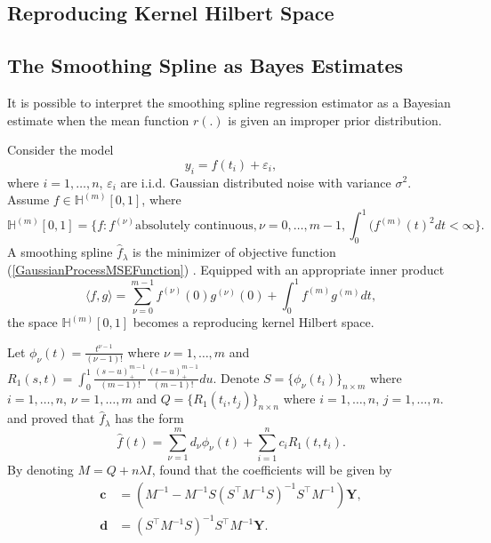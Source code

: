 \subsection{Reproducing Kernel Hilbert Space}



\subsection{The Smoothing Spline as Bayes Estimates}
It is possible to interpret the smoothing spline regression estimator as a Bayesian estimate when the mean function $r( .)$ is given an improper prior distribution. \cite{berlinet2011reproducing}
\cite{wahba1990spline}


Consider the model
\begin{equation}
y_i=f(t_i)+\varepsilon_i, 
\end{equation}
where $i=1, \ldots, n$, $\varepsilon_i$ are i.i.d. Gaussian distributed noise with variance $\sigma^2$. Assume $f\in \mathbb{H}^{(m)}[0,1]$, where
\begin{equation}
\mathbb{H}^{(m)}[0,1]=\{f:f^{(\nu)} \mbox{absolutely continuous}, \nu=0,\ldots,m-1, \int_{0}^{1} (f^{(m)}(t)^2dt<\infty \}.
\end{equation}
A smoothing spline $\hat{f}_\lambda$ is the minimizer of objective function (\ref{GaussianProcessMSEFunction}) \cite{wang1998smoothing}. Equipped with an appropriate inner product
\begin{equation}
\langle f,g\rangle=\sum_{\nu=0}^{m-1}f^{(\nu)}(0)g^{(\nu)}(0)+\int_{0}^{1}f^{(m)}g^{(m)}dt,
\end{equation}
the space $\mathbb{H}^{(m)}[0,1]$ becomes a reproducing kernel Hilbert space.

Let $\phi_\nu (t)=\frac{t^{\nu-1}}{(\nu-1)!}$ where $\nu=1, \ldots, m$ and $R_1(s,t)=\int_0^1\frac{ (s-u)_+^{m-1}}{(m-1)!} \frac{ (t-u)_+^{m-1}}{(m-1)!} du$. Denote $S=\{\phi_\nu (t_i) \}_{n\times m}$ where $i=1, \ldots, n$, $\nu=1, \ldots, m$ and $Q=\{ R_1(t_i,t_j)\}_{n\times n}$ where $i=1, \ldots, n$, $j=1, \ldots, n$. \cite{kimeldorf1971some} and \cite{kimeldorf1970correspondence}  proved that $\hat{f}_\lambda$ has the form
\begin{equation}
\hat{f}(t)=\sum_{\nu=1}^m d_\nu \phi_\nu(t)+\sum_{i=1}^n c_iR_1(t,t_i).
\end{equation}
By denoting $M=Q+n\lambda I$, \cite{gu2013smoothing} found that the coefficients will be given by
\begin{align}
\mathbf{c}&=(M^{-1}-M^{-1}S(S^\top M^{-1}S)^{-1}S^\top M^{-1})\mathbf{Y},\\
\mathbf{d}&=(S^\top M^{-1}S)^{-1}S^\top M^{-1}\mathbf{Y}.
\end{align}



